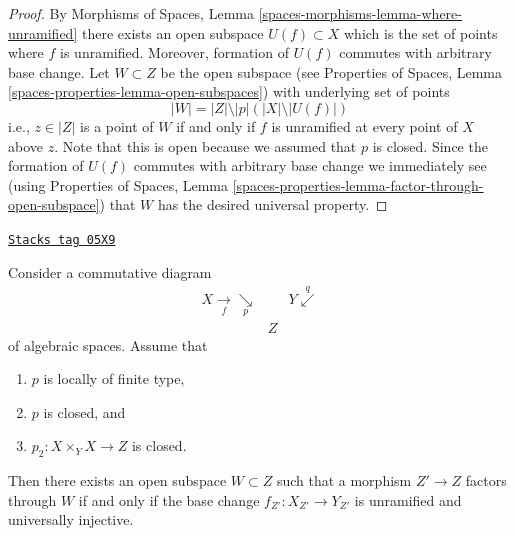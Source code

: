 \begin{proof}
By
Morphisms of Spaces, Lemma \ref{spaces-morphisms-lemma-where-unramified}
there exists an open subspace $U(f) \subset X$ which is the set of
points where $f$ is unramified. Moreover, formation of $U(f)$ commutes
with arbitrary base change. Let $W \subset Z$ be the open subspace
(see
Properties of Spaces, Lemma
\ref{spaces-properties-lemma-open-subspaces})
with underlying set of points
$$
|W| = |Z| \setminus |p|\left(|X| \setminus |U(f)|\right)
$$
i.e., $z \in |Z|$ is a point of $W$ if and only if $f$ is unramified
at every point of $X$ above $z$. Note that this is open because we
assumed that $p$ is closed. Since the formation of $U(f)$
commutes with arbitrary base change we immediately see (using
Properties of Spaces, Lemma
\ref{spaces-properties-lemma-factor-through-open-subspace})
that $W$ has the desired universal property.
\end{proof}

\begin{lemma}
\label{spaces-more-morphisms-lemma-where-unramified-universally-injective}
\href{https://stacks.math.columbia.edu/tag/05X9}{\texttt{Stacks tag 05X9}}

Consider a commutative diagram
$$
\begin{array}{ccc}X \underset{f}{\longrightarrow}\underset{p}{\searrow} &  & Y \overset{q}{\swarrow} \\  & Z & \end{array}
$$
of algebraic spaces. Assume that
\begin{enumerate}
\item $p$ is locally of finite type,
\item $p$ is closed, and
\item $p_2 : X \times_Y X \to Z$ is closed.
\end{enumerate}
Then there exists an open subspace $W \subset Z$
such that a morphism $Z' \to Z$ factors through $W$ if and only if the
base change $f_{Z'} : X_{Z'} \to Y_{Z'}$ is unramified and universally
injective.
\end{lemma}

